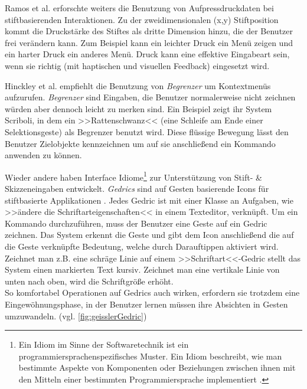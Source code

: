 \medskip Ramos et al. \citep{Ramos:2004} erforschte weiters die Benutzung von Aufpressdruckdaten bei stiftbasierenden Interaktionen. Zu der zweidimensionalen (x,y) Stiftposition kommt die Druckstärke des Stiftes als dritte Dimension hinzu, die der Benutzer frei verändern kann. Zum Beispiel kann ein leichter Druck ein Menü zeigen und ein harter Druck ein anderes Menü. Druck kann eine effektive Eingabeart sein, wenn sie richtig (mit haptischen und visuellen Feedback) eingesetzt wird.

\medskip Hinckley et al. \citep{Hinckley:2005} empfiehlt die Benutzung von \emph{Begrenzer} um Kontextmenüs aufzurufen. \emph{Begrenzer} sind Eingaben, die Benutzer normalerweise nicht zeichnen würden aber dennoch leicht zu merken sind. Ein Beispiel zeigt ihr System Scriboli, in dem ein >>Rattenschwanz<< (eine Schleife am Ende einer Selektionsgeste) als Begrenzer benutzt wird. Diese flüssige Bewegung lässt den Benutzer Zielobjekte kennzeichnen um auf sie anschließend ein Kommando anwenden zu können.

\medskip Wieder andere haben Interface Idiome\footnote{Ein Idiom im Sinne der Softwaretechnik ist ein programmiersprachenspezifisches Muster. Ein Idiom beschreibt, wie man bestimmte Aspekte von Komponenten oder Beziehungen zwischen ihnen mit den Mitteln einer bestimmten Programmiersprache implementiert \citep{Buschmann:1998}.} zur Unterstützung von Stift- \& Skizzeneingaben entwickelt. \emph{Gedrics} sind auf Gesten basierende Icons für stiftbasierte Applikationen \citep{Geissler:1995}. Jedes Gedric ist mit einer Klasse an Aufgaben, wie >>ändere die Schriftarteigenschaften<< in einem Texteditor, verknüpft. Um ein Kommando durchzuführen, muss der Benutzer eine Geste auf ein Gedric zeichnen. Das System erkennt die Geste und gibt dem Icon anschließend die auf die Geste verknüpfte Bedeutung, welche durch Darauftippen aktiviert wird. Zeichnet man z.B. eine schräge Linie auf einem >>Schriftart<<-Gedric stellt das System einen markierten Text kursiv. Zeichnet man eine vertikale Linie von unten nach oben, wird die Schriftgröße erhöht. \\ So komfortabel Operationen auf Gedrics auch wirken, erfordern sie trotzdem eine Eingewöhnungsphase, in der Benutzer lernen müssen ihre Absichten in Gesten umzuwandeln. (vgl. \autoref{fig:geisslerGedric}) 

